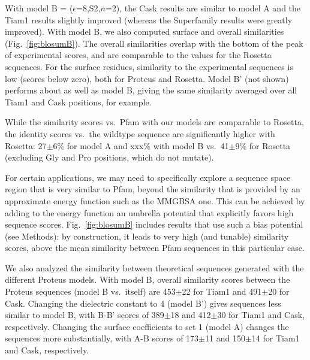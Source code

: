 \documentclass[12pt]{article}
\begin{document}
With model B = ($\epsilon$=8,S2,$n$=2), the Cask results are similar to model A and the Tiam1 results slightly improved (whereas
the Superfamily results were greatly improved). With model B, we also computed surface and overall similarities (Fig.\
\ref{fig:blosumB}). The overall similarities overlap with the bottom of the peak of experimental scores, and are comparable to the
values for the Rosetta sequences. For the surface residues, similarity to the experimental sequences is low (scores below zero),
both for Proteus and Rosetta. Model B' (not shown) performs about as well as model B, giving the same similarity averaged over
all Tiam1 and Cask positions, for example.

While the similarity scores vs.\ Pfam with our models are comparable to Rosetta, the identity scores vs.\ the wildtype sequence
are significantly higher with Rosetta: 27$\pm$6\% for model A and xxx\% with model B vs.\ 41$\pm$9\% for Rosetta (excluding Gly
and Pro positions, which do not mutate).

For certain applications, we may need to specifically explore a sequence space region that is very similar to Pfam, beyond
the similarity that is provided by an approximate energy function such as the MMGBSA one. This can be achieved by adding to
the energy function an umbrella potential that explicitly favors high sequence scores. Fig.\ \ref{fig:blosumB} includes results
that use such a bias potential (see Methods): by construction, it leads to very high (and tunable) similarity scores, above the
mean similarity between Pfam sequences in this particular case.

We also analyzed the similarity between theoretical sequences generated with the different Proteus models. With model B, overall
similarity scores between the Proteus sequences (model B vs.\ itself) are 453$\pm$22 for Tiam1 and 491$\pm$20 for Cask. Changing
the dielectric constant to 4 (model B') gives sequences less similar to model B, with B-B' scores of 389$\pm$18 and 412$\pm$30
for Tiam1 and Cask, respectively. Changing the surface coefficients to set 1 (model A) changes the sequences more substantially,
with A-B scores of 173$\pm$11 and 150$\pm$14 for Tiam1 and Cask, respectively. 
\end{document}
